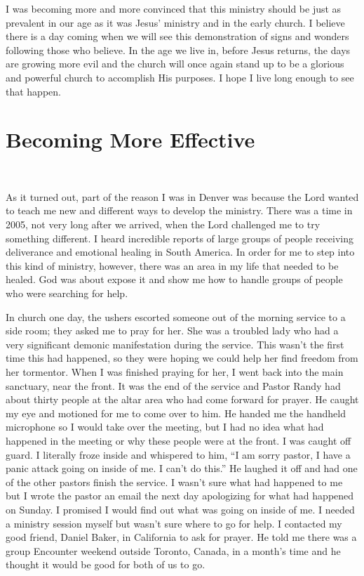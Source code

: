 \documentclass[oneside]{book}
\begin{document}
I was becoming more and more convinced that this ministry should be just as prevalent in our age as it was Jesus’ ministry and in the early church. I believe there is a day coming when we will see this demonstration of signs and wonders following those who believe. In the age we live in, before Jesus returns, the days are growing more evil and the church will once again stand up to be a glorious and powerful church to accomplish His purposes. I hope I live long enough to see that happen. 


\chapter{Becoming More Effective}
\

As it turned out, part of the reason I was in Denver was because the Lord wanted to teach me new and different ways to develop the ministry. There was a time in 2005, not very long after we arrived, when the Lord challenged me to try something different. I heard incredible reports of large groups of people receiving deliverance and emotional healing in South America. In order for me to step into this kind of ministry, however, there was an area in my life that needed to be healed. God was about expose it and show me how to handle groups of people who were searching for help.

In church one day, the ushers escorted someone out of the morning service to a side room; they asked me to pray for her. She was a troubled lady who had a very significant demonic manifestation during the service. This wasn’t the first time this had happened, so they were hoping we could help her find freedom from her tormentor. When I was finished praying for her, I went back into the main sanctuary, near the front. It was the end of the service and Pastor Randy had about thirty people at the altar area who had come forward for prayer. He caught my eye and motioned for me to come over to him. He handed me the handheld microphone so I would take over the meeting, but I had no idea what had happened in the meeting or why these people were at the front. I was caught off guard. I literally froze inside and whispered to him, “I am sorry pastor, I have a panic attack going on inside of me. I can’t do this.” He laughed it off and had one of the other pastors finish the service. I wasn’t sure what had happened to me but I wrote the pastor an email the next day apologizing for what had happened on Sunday. I promised I would find out what was going on inside of me. I needed a ministry session myself but wasn’t sure where to go for help. I contacted my good friend, Daniel Baker, in California to ask for prayer. He told me there was a group Encounter weekend outside Toronto, Canada, in a month's time and he thought it would be good for both of us to go. 
\end{document}
